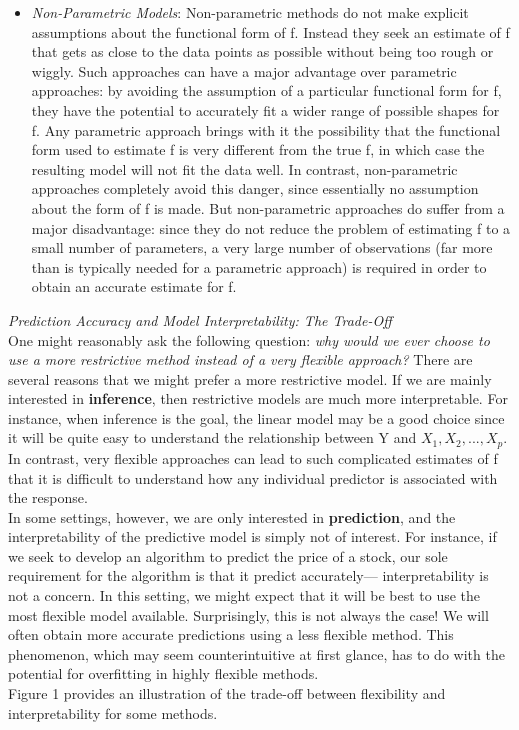 \documentclass[12pt,a4paper]{article}
\begin{document}
\begin{itemize}
\item \textit{Non-Parametric Models}: Non-parametric methods do not make explicit assumptions about the functional form of f. Instead they seek an estimate of f that gets as close to the data points as possible without being too rough or wiggly. Such approaches can have a major advantage over parametric approaches: by avoiding the assumption of a particular functional form for f, they have the potential to accurately fit a wider range of possible shapes for f. Any parametric approach brings with it the possibility that the functional form used to estimate f is very different from the true f, in which case the resulting model will not fit the data well. In contrast, non-parametric approaches completely avoid this danger, since essentially no assumption about the form of f is made. But non-parametric approaches do suffer from a major disadvantage: since they do not reduce the problem of estimating f to a small number of parameters, a very large number of observations (far more than is typically needed for a parametric approach) is required in order to obtain an accurate estimate for f.
\end{itemize}
\newpage
\textit{Prediction Accuracy and Model Interpretability: The Trade-Off}\\
\newline
One might reasonably ask the following question: \textit{why would we ever choose to use a more restrictive method instead of a very flexible approach?} There are several reasons that we might prefer a more restrictive model. If we are mainly interested in \textbf{inference}, then restrictive models are much more interpretable. For instance, when inference is the goal, the linear model may be a good choice since it will be quite easy to understand the relationship between Y and $X_{1},X_{2},...,X_{p}$. In contrast, very flexible approaches can lead to such complicated estimates of f that it is difficult to understand how any individual predictor is associated with the response. \\
\newline
In some settings, however, we are only interested in \textbf{prediction}, and the interpretability of the predictive model is simply not of interest. For instance, if we seek to develop an algorithm to predict the price of a stock, our sole requirement for the algorithm is that it predict accurately— interpretability is not a concern. In this setting, we might expect that it will be best to use the most flexible model available. Surprisingly, this is not always the case! We will often obtain more accurate predictions using a less ﬂexible method. This phenomenon, which may seem counterintuitive at first glance, has to do with the potential for overfitting in highly flexible methods.\\
\newline
Figure 1 provides an illustration of the trade-off between ﬂexibility and interpretability for some methods.
 
\end{document}
